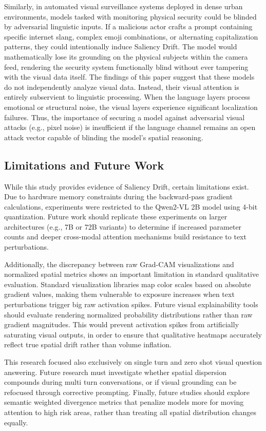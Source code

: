 \documentclass[11pt, letterpaper]{article}
\begin{document}
Similarly, in automated visual surveillance systems deployed in dense urban environments, models tasked with monitoring physical security could be blinded by adversarial linguistic inputs. If a malicious actor crafts a prompt containing specific internet slang, complex emoji combinations, or alternating capitalization patterns, they could intentionally induce Saliency Drift. The model would mathematically lose its grounding on the physical subjects within the camera feed, rendering the security system functionally blind without ever tampering with the visual data itself. The findings of this paper suggest that these models do not independently analyze visual data. Instead, their visual attention is entirely subservient to linguistic processing. When the language layers process emotional or structural noise, the visual layers experience significant localization failures. Thus, the importance of securing a model against adversarial visual attacks (e.g., pixel noise) is insufficient if the language channel remains an open attack vector capable of blinding the model's spatial reasoning.

\subsection{Limitations and Future Work}
While this study provides evidence of Saliency Drift, certain limitations exist. Due to hardware memory constraints during the backward-pass gradient calculations, experiments were restricted to the Qwen2-VL 2B model using 4-bit quantization. Future work should replicate these experiments on larger architectures (e.g., 7B or 72B variants) to determine if increased parameter counts and deeper cross-modal attention mechanisms build resistance to text perturbations.

Additionally, the discrepancy between raw Grad-CAM visualizations and normalized spatial metrics shows an important limitation in standard qualitative evaluation. Standard visualization libraries map color scales based on absolute gradient values, making them vulnerable to exposure increases when text perturbations trigger big raw activation spikes. Future visual explainability tools should evaluate rendering normalized probability distributions rather than raw gradient magnitudes. This would prevent activation spikes from artificially saturating visual outputs, in order to ensure that qualitative heatmaps accurately reflect true spatial drift rather than volume inflation.

This research focused also exclusively on single turn and zero shot visual question answering. Future research must investigate whether spatial dispersion compounds  during multi turn conversations, or if visual grounding can be refocused through corrective prompting. Finally, future studies should explore semantic weighted divergence metrics that penalize models more for moving attention to high risk areas, rather than treating all spatial distribution changes equally.
\end{document}
